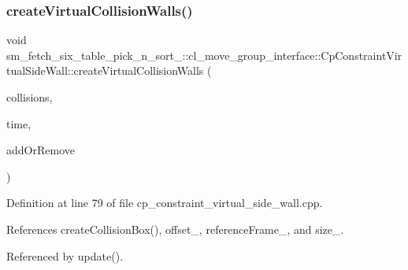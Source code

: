\subsubsection{\texorpdfstring{create\+Virtual\+Collision\+Walls()}{createVirtualCollisionWalls()}}
{\footnotesize\ttfamily void sm\+\_\+fetch\+\_\+six\+\_\+table\+\_\+pick\+\_\+n\+\_\+sort\+\_\+::cl\+\_\+move\+\_\+group\+\_\+interface\+::\+Cp\+Constraint\+Virtual\+Side\+Wall\+::create\+Virtual\+Collision\+Walls (\begin{DoxyParamCaption}\item[{std\+::vector$<$ moveit\+\_\+msgs\+::\+Collision\+Object $>$ \&}]{collisions,  }\item[{const ros\+::\+Time \&}]{time,  }\item[{int}]{add\+Or\+Remove }\end{DoxyParamCaption})}



Definition at line 79 of file cp\+\_\+constraint\+\_\+virtual\+\_\+side\+\_\+wall.\+cpp.



References create\+Collision\+Box(), offset\+\_\+, reference\+Frame\+\_\+, and size\+\_\+.



Referenced by update().


